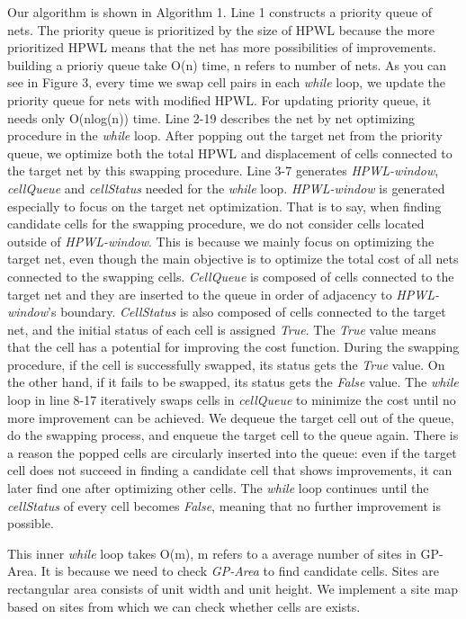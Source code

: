 \documentclass[sigconf,authordraft]{acmart}
\begin{document}
Our algorithm is shown in Algorithm 1. 
Line 1 constructs a priority queue of nets. 
The priority queue is prioritized by the size of HPWL because the more prioritized HPWL means that the net has more possibilities of improvements. 
building a prioriy queue take O(n) time, n refers to number of nets.
As you can see in Figure 3, every time we swap cell pairs in each \textit{while} loop, we update the priority queue for nets with modified HPWL. 
For updating priority queue, it needs only O(nlog(n)) time. %
Line 2-19 describes the net by net optimizing procedure in the \textit{while} loop. 
After popping out the target net from the priority queue, we optimize both the total HPWL and displacement of cells connected to the target net by this swapping procedure. 
Line 3-7 generates \textit{HPWL-window}, \textit{cellQueue} and \textit{cellStatus} needed for the \textit{while} loop. \textit{HPWL-window} is generated especially to focus on the target net optimization. 
That is to say, when finding candidate cells for the swapping procedure, 
we do not consider cells located outside of \textit{HPWL-window}. This is because we mainly focus on optimizing the target net, even though the main objective is to optimize the total cost of all nets connected to the swapping cells. 
\textit{CellQueue} is composed of cells connected to the target net and they are inserted to the queue in order of adjacency to \textit{HPWL-window}'s boundary. 
\textit{CellStatus} is also composed of cells connected to the target net, and the initial status of each cell is assigned \textit{True}. The \textit{True} value means that the cell has a potential for improving the cost function. During the swapping procedure, if the cell is successfully swapped, its status gets the \textit{True} value. On the other hand, if it fails to be swapped, its status gets the \textit{False} value. 
The \textit{while} loop in line 8-17 iteratively swaps cells in \textit{cellQueue} to minimize the cost until no more improvement can be achieved. We dequeue the target cell out of the queue, do the swapping process, and enqueue the target cell to the queue again. There is a reason the popped cells are circularly inserted into the queue: even if the target cell does not succeed in finding a candidate cell that shows improvements, it can later find one after optimizing other cells. The \textit{while} loop continues until the \textit{cellStatus} of every cell becomes \textit{False}, meaning that no further improvement is possible. 

This inner \textit{while} loop takes O(m), m refers to a average number of sites in GP-Area. 
It is because we need to check \textit{GP-Area} to find candidate cells. 
Sites are rectangular area consists of unit width and unit height.
We implement a site map based on sites from which we can check whether cells are exists. 
\end{document}

